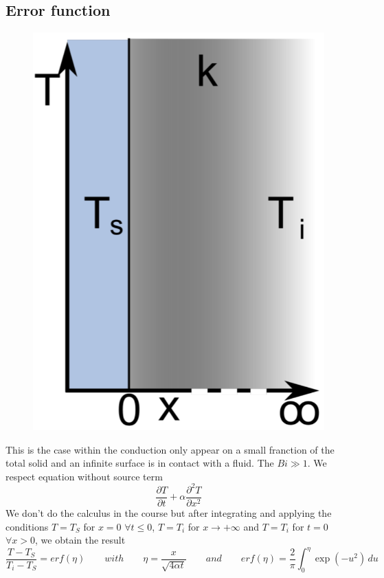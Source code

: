 	\subsection{Error function}
		\begin{figure}
		\vspace{-5mm}
		\includegraphics[scale=0.2]{ch4/2}
		\end{figure}	
		This is the case within the conduction only appear on a small franction of the total solid and an infinite surface is in contact with a fluid. The $Bi \gg 1$. We respect equation without source term 
		\begin{equation}
			\frac{\partial T}{\partial t} + \alpha \frac{\partial ^2 T}{\partial x^2 }
		\end{equation}
		We don't do the calculus in the course but after integrating and applying the conditions $T = T_S$ for $x=0$ $\forall t \leq 0$, $T = T_i$ for $x\rightarrow + \infty$ and $T = T_i$ for $t=0$ $\forall x > 0$, we obtain the result 
		\begin{equation}
			\frac{T-T_S}{T_i-T_S} = erf(\eta ) \qquad with \qquad \eta = \frac{x}{\sqrt{4\alpha t}} \qquad and \qquad erf(\eta ) = \frac{2}{\pi} \int _0 ^\eta \exp (-u^2) \, du
		\end{equation}
		
